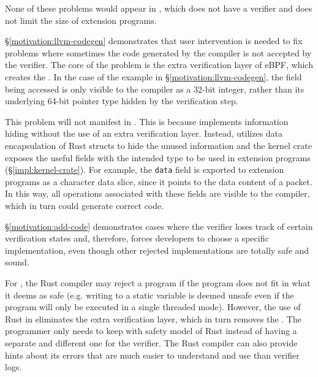 None of these problems would appear in \projname{}, which does not
    have a verifier and does not limit the size of extension programs.

 \S\ref{motivation:llvm-codegen} demonstrates that
    user intervention is needed to fix problems where sometimes the code generated
    by the compiler is not accepted by the verifier.
The core of the problem is the extra verification layer of eBPF, which creates
    the \gap{}.
In the case of the example in \S\ref{motivation:llvm-codegen}, the field being
    accessed is only visible to the compiler as a 32-bit integer,
    rather than its underlying 64-bit pointer type hidden by the verification
    step.

This problem will not manifest in \projname{}.
This is because \projname{} implements information hiding without the use of
    an extra verification layer.
Instead, \projname{} utilizes data encapsulation of Rust structs to hide the
    unused information and the kernel crate exposes the useful fields with the
    intended type to be used in extension programs (\S\ref{impl:kernel-crate}).
For example, the \texttt{data} field is exported to extension programs as a
    character data slice, since it points to the data content of a packet.
In this way, all operations associated with these fields are visible to the
    compiler, which in turn could generate correct code.

\S\ref{motivation:add-code} demonstrates cases where the verifier loses track
    of certain verification states and, therefore, forces developers to
    choose a specific implementation, even though other rejected
    implementations are totally safe and sound.

For \projname{}, the Rust compiler may reject a program if the program does not
    fit in what it deems as safe (e.g. writing to a static variable is deemed
    unsafe even if the program will only be executed in a single threaded
    mode).
However, the use of Rust in \projname{} eliminates the extra verification layer,
    which in turn removes the \gap{}. %
The programmer only needs to keep with safety model of Rust instead of having a
    separate and different one for the verifier.
The Rust compiler can also provide hints about its errors that are much
    easier to understand and use than verifier logs.

